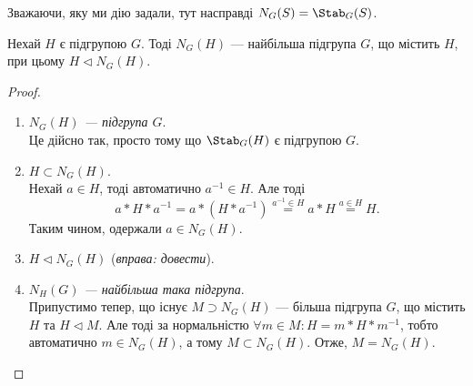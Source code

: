 \documentclass{math_library}
\begin{document}
\begin{remark}
Зважаючи, яку ми дію задали, тут насправді $N_G(S) = \Stab_G(S)$.
\end{remark}

\begin{proposition}
Нехай $H$ є підгрупою $G$. Тоді $N_G(H)$ --- найбільша підгрупа $G$, що містить $H$, при цьому $H \triangleleft N_G(H)$.
\end{proposition}

\begin{proof}
\begin{enumerate}[topsep=0pt,wide=0pt,label={\Roman*.}]
\item \textit{$N_G(H)$ --- підгрупа $G$}. \\
Це дійсно так, просто тому що $\Stab_G(H)$ є підгрупою $G$.

\item \textit{$H \subset N_G(H)$}.\\
Нехай $a \in H$, тоді автоматично $a^{-1} \in H$. Але тоді
\[
a*H*a^{-1} = a*(H*a^{-1}) \overset{a^{-1} \in H}{=} a*H \overset{a \in H}{=} H.
\]
Таким чином, одержали $a \in N_G(H)$.

\item \textit{$H \triangleleft N_G(H)$} (\textit{вправа: довести}).

\item \textit{$N_H(G)$ --- найбільша така підгрупа}.\\
Припустимо тепер, що існує $M \supset N_G(H)$ --- більша підгрупа $G$, що містить $H$ та $H \triangleleft M$. Але тоді за нормальністю $\forall m \in M: H = m*H*m^{-1}$, тобто автоматично $m \in N_G(H)$, а тому $M \subset N_G(H)$. Отже, $M = N_G(H)$. \qedhere
\end{enumerate}
\end{proof}
\end{document}
